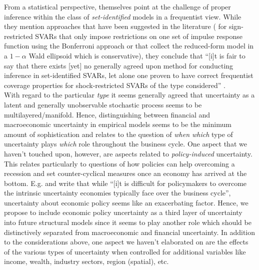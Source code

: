 \documentclass[a4paper,11pt,listof=nochaptergap,oneside,pointednumbers,bibtotoc,bigheadings,liststotoc,hidelinks]{scrbook}
\theoremstyle{mysatz}
\theoremstyle{mydefinition}
\theoremstyle{mytheorem}
\theoremstyle{mybemerkung}
\begin{document}
From a statistical perspective, \citet{ludvigsonetal:18, ludvigsonetal:19} themselves point at the challenge of proper inference within the class of \textit{set-identified} models in a frequentist view. While they mention approaches that have been suggested in the literature (\citet{granzieraetal:18} for sign-restricted SVARs that only impose restrictions on one set of impulse response function using the Bonferroni approach or \citet{gafarovetal:15} that collect the reduced-form model in a $1-\alpha$ Wald ellipsoid which is conservative), they conclude that ``[i]t is fair to say that there exists [yet] no generally agreed upon method for conducting inference in set-identified SVARs, let alone one proven to have correct frequentist coverage properties for shock-restricted SVARs of the type considered'' \citet[p. 10]{ludvigsonetal:20a}. \\

With regard to the particular \textit{type} it seems generally agreed that uncertainty as a latent and generally unobservable stochastic process seems to be multilayered/manifold. Hence, distinguishing between financial and macroeconomic uncertainty in empirical models seems to be the minimum amount of sophistication and relates to the question of \textit{when which} type of uncertainty plays \textit{which} role throughout the business cycle. One aspect that we haven't touched upon, however, are aspects related to \textit{policy-induced} uncertainty. This relates particularly to questions of how policies can help overcoming a recession and set counter-cyclical measures once an economy has arrived at the bottom. E.g. \citet[p. 41]{bloometal:13} and \citet{IMF:12} write that while ``[i]t is difficult for policymakers to overcome the intrinsic uncertainty economies typically face over the business cycle'', uncertainty about economic policy seems like an exacerbating factor. Hence, we propose to include economic policy uncertainty as a third layer of uncertainty into future structural models since it seems to play another role which should be distinctively separated from macroeconomic and financial uncertainty. In addition to the considerations above, one aspect we haven't elaborated on are the effects of the various types of uncertainty when controlled for additional variables like income, wealth, industry sectors, region (spatial), etc. \\
\end{document}
